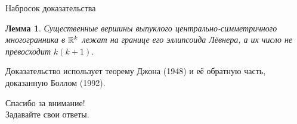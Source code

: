 \documentclass{beamer}
\newtheorem{lem}{Лемма}
\begin{document}
\begin{frame}{Набросок доказательства}
	\begin{lem}
		Существенные вершины выпуклого центрально-симметричного многогранника в $\mathbb {R}^k$ лежат на границе его эллипсоида Лёвнера, а их число не превосходит $k(k+1)$.
	\end{lem}\pause
	Доказательство использует теорему Джона (1948) и её обратную часть, доказанную Боллом (1992).
\end{frame}

\begin{frame}{}
	\begin{center}
		Спасибо за внимание!\\
		Задавайте свои ответы.
	\end{center}
\end{frame}
\end{document}
